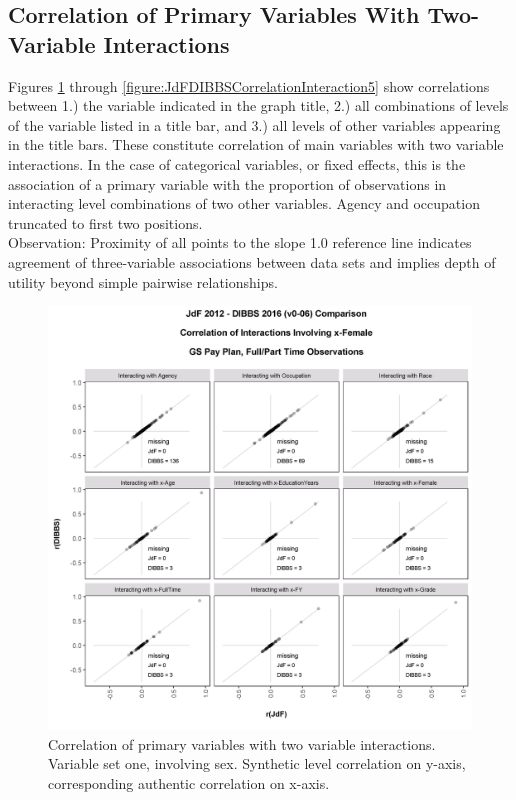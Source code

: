 \documentclass[10pt, letterpaper]{article}
\begin{document}
\begin{spacing}{1.0}
\clearpage

\subsection{Correlation of Primary Variables With Two-Variable Interactions}

Figures \ref{figure:JdFDIBBSCorrelationInteraction1} through \ref{figure:JdFDIBBSCorrelationInteraction5} show correlations between 1.) the variable indicated in the graph title, 2.) all combinations of levels of the variable listed in a title bar, and 3.) all levels of other variables appearing in the title bars.  These constitute correlation of main variables with two variable interactions.  In the case of categorical variables, or fixed effects, this is the association of a primary variable with the proportion of observations in interacting level combinations of two other variables.  Agency and occupation truncated to first two positions.\\

Observation:  Proximity of all points to the slope 1.0 reference line indicates agreement of three-variable associations between data sets and implies depth of utility beyond simple pairwise relationships.\\

\vspace{20pt}

\begin{figure}[h]
    \centering
    \includegraphics[width=5in, trim={0 0.2in 0 1in}, clip]{JdFDIBBSCorrelationInteraction-x-Female.png}
    \caption{Correlation of primary variables with two variable interactions.  Variable set one, involving sex.  Synthetic level correlation on y-axis, corresponding authentic correlation on x-axis.}
    \label{figure:JdFDIBBSCorrelationInteraction1}
\end{figure}


\end{spacing}
\end{document}
